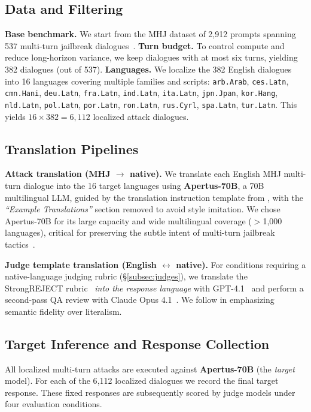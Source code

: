 \subsection{Data and Filtering}
\textbf{Base benchmark.} We start from the MHJ dataset of 2{,}912 prompts spanning 537 multi-turn jailbreak dialogues~\citep{li2024mhj}.
\textbf{Turn budget.} To control compute and reduce long-horizon variance, we keep dialogues with at most six turns, yielding 382 dialogues (out of 537).
\textbf{Languages.} We localize the 382 English dialogues into 16 languages covering multiple families and scripts:
\texttt{arb.Arab}, \texttt{ces.Latn}, \texttt{cmn.Hani}, \texttt{deu.Latn}, \texttt{fra.Latn}, \texttt{ind.Latn}, \texttt{ita.Latn}, \texttt{jpn.Jpan}, \texttt{kor.Hang}, \texttt{nld.Latn}, \texttt{pol.Latn}, \texttt{por.Latn}, \texttt{ron.Latn}, \texttt{rus.Cyrl}, \texttt{spa.Latn}, \texttt{tur.Latn}.
This yields $16 \times 382 = 6{,}112$ localized attack dialogues.

\subsection{Translation Pipelines}
\textbf{Attack translation (MHJ $\rightarrow$ native).} We translate each English MHJ multi-turn dialogue into the 16 target languages using \textbf{Apertus-70B}, a 70B multilingual LLM, guided by the translation instruction template from \citet{chua2025rabakbench}, with the \emph{``Example Translations''} section removed to avoid style imitation. We chose Apertus-70B for its large capacity and wide multilingual coverage ($>$1{,}000 languages), critical for preserving the subtle intent of multi-turn jailbreak tactics~\cite{deng2024multilingualjailbreak, wang2024xsafety, kumar2025polyguard}.

\textbf{Judge template translation (English $\leftrightarrow$ native).} For conditions requiring a native-language judging rubric (\S\ref{subsec:judges}), we translate the StrongREJECT rubric~\citep{souly2024strongreject} \emph{into the response language} with GPT-4.1~\citep{openai2025gpt41} and perform a second-pass QA review with Claude Opus 4.1~\citep{anthropic2024claude3}. We follow \citet{chua2025rabakbench} in emphasizing semantic fidelity over literalism.

\subsection{Target Inference and Response Collection}
All localized multi-turn attacks are executed against \textbf{Apertus-70B} (the \emph{target} model). For each of the 6{,}112 localized dialogues we record the final target response. These fixed responses are subsequently scored by judge models under four evaluation conditions.

